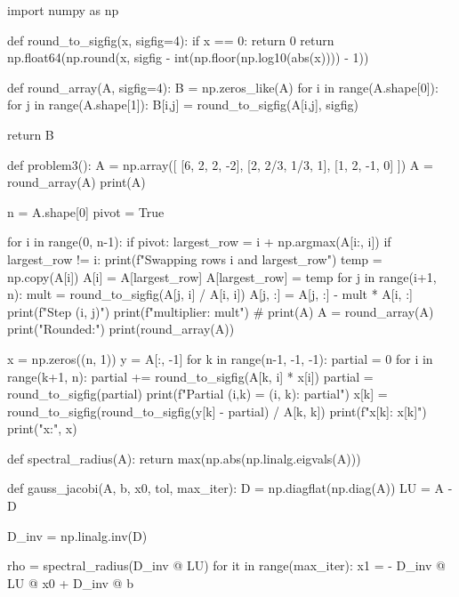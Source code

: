 \documentclass{homework}
\title{}
\author{Sean Jennings}
\date{}
\begin{document}
\maketitle

\begin{python}

import numpy as np


def round_to_sigfig(x, sigfig=4):
    if x == 0:
            return 0
    return np.float64(np.round(x, sigfig - int(np.floor(np.log10(abs(x)))) - 1))

def round_array(A, sigfig=4):
    B = np.zeros_like(A)
    for i in range(A.shape[0]):
        for j in range(A.shape[1]):
            B[i,j] = round_to_sigfig(A[i,j], sigfig)

    return B

def problem3():
    A = np.array([
        [6, 2, 2, -2],
        [2, 2/3, 1/3, 1],
        [1, 2, -1, 0]
    ])
    A = round_array(A)
    print(A)

    n = A.shape[0]
    pivot = True

    for i in range(0, n-1):
        if pivot:
            largest_row = i + np.argmax(A[i:, i])
            if largest_row != i:
                print(f"Swapping rows {i} and {largest_row}")
                temp = np.copy(A[i])
                A[i] = A[largest_row]
                A[largest_row] = temp
        for j in range(i+1, n):
            mult = round_to_sigfig(A[j, i] / A[i, i])
            A[j, :] = A[j, :] - mult * A[i, :]
            print(f"Step ({i}, {j})")
            print(f"multiplier: {mult}")
            # print(A)
            A = round_array(A)
            print("Rounded:")
            print(round_array(A))


    x = np.zeros((n, 1))
    y = A[:, -1]
    for k in range(n-1, -1, -1):
        partial = 0
        for i in range(k+1, n):
            partial += round_to_sigfig(A[k, i] * x[i])
            partial = round_to_sigfig(partial)
            print(f"Partial (i,k) = ({i}, {k}): {partial}")
        x[k] = round_to_sigfig(round_to_sigfig(y[k] - partial) / A[k, k])
        print(f"x[{k}]: {x[k]}")
    print("x:", x)


def spectral_radius(A):
    return max(np.abs(np.linalg.eigvals(A)))


def gauss_jacobi(A, b, x0, tol, max_iter):
    D = np.diagflat(np.diag(A))
    LU = A - D

    D_inv = np.linalg.inv(D)

    rho = spectral_radius(D_inv @ LU)
    for it in range(max_iter):
        x1 = - D_inv @ LU @ x0 + D_inv @ b


\end{python}
\end{document}
